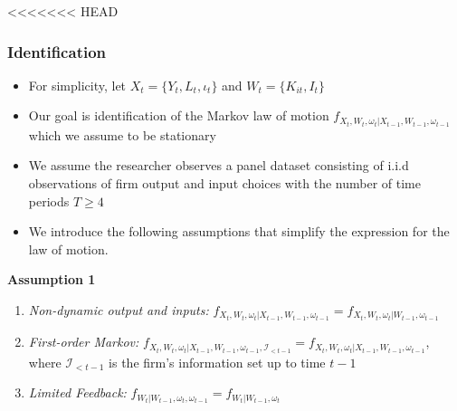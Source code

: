 \documentclass{beamer}
\begin{document}
<<<<<<< HEAD
\begin{frame}
\frametitle{Identification}
\begin{itemize}
\item For simplicity, let $X_{t}=\{Y_{t}, L_{t}, \iota_{t}\}$ and $W_{t}=\{K_{it}, I_{t}\}$
\item Our goal is identification of the Markov law of motion $f_{X_{t}, W_{t}, \omega_{t}|X_{t-1}, W_{t-1}, \omega_{t-1}}$ which we assume to be stationary
\item We assume the researcher observes a panel dataset consisting of i.i.d observations of firm output and input choices with the number of time periods $T\geq 4$
\item We introduce the following assumptions that simplify the expression for the law of motion. 
\end{itemize}
\textbf{Assumption 1}
\begin{enumerate}
    \item \textit{Non-dynamic output and inputs:} $f_{X_{t}, W_{t}, \omega_{t}|X_{t-1}, W_{t-1}, \omega_{t-1}}=f_{X_{t}, W_{t}, \omega_{t}|W_{t-1}, \omega_{t-1}}$
    \item \textit{First-order Markov:} $f_{X_{t}, W_{t}, \omega_{t}|X_{t-1}, W_{t-1}, \omega_{t-1}, \mathcal{I}_{<t-1}}=f_{X_{t}, W_{t}, \omega_{t}|X_{t-1}, W_{t-1}, \omega_{t-1}}$, where $\mathcal{I}_{<t-1}$ is the firm's information set up to time $t-1$
    \item \textit{Limited Feedback:} $f_{W_{t}|W_{t-1}, \omega_{t}, \omega_{t-1}}=f_{W_{t}|W_{t-1}, \omega_{t}}$ 
\end{enumerate}
\end{frame}
\end{document}
